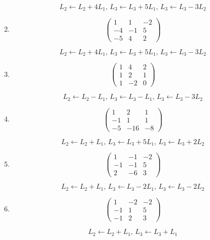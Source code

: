 \documentclass{article}
\begin{document}
\begin{enumerate}

$$ L_2 \leftarrow L_2 + 4L_1,\, 
L_3 \leftarrow L_3 + 5L_1,\, 
L_3 \leftarrow L_3 - 3L_2 $$
\item
$$ \begin{pmatrix}
1 & 1 & -2 \\ 
-4 & -1 & 5 \\ 
-5 & 4 & 2
\end{pmatrix} $$


$$ L_2 \leftarrow L_2 + 4L_1,\, 
L_3 \leftarrow L_3 + 5L_1,\, 
L_3 \leftarrow L_3 - 3L_2 $$
\item
$$ \begin{pmatrix}
1 & 4 & 2 \\ 
1 & 2 & 1 \\ 
1 & -2 & 0
\end{pmatrix} $$


$$ L_2 \leftarrow L_2 - L_1,\, 
L_3 \leftarrow L_3 - L_1,\, 
L_3 \leftarrow L_3 - 3L_2 $$
\item
$$ \begin{pmatrix}
1 & 2 & 1 \\ 
-1 & 1 & 1 \\ 
-5 & -16 & -8
\end{pmatrix} $$


$$ L_2 \leftarrow L_2 + L_1,\, 
L_3 \leftarrow L_3 + 5L_1,\, 
L_3 \leftarrow L_3 + 2L_2 $$
\item
$$ \begin{pmatrix}
1 & -1 & -2 \\ 
-1 & -1 & 5 \\ 
2 & -6 & 3
\end{pmatrix} $$


$$ L_2 \leftarrow L_2 + L_1,\, 
L_3 \leftarrow L_3 - 2L_1,\, 
L_3 \leftarrow L_3 - 2L_2 $$
\item
$$ \begin{pmatrix}
1 & -2 & -2 \\ 
-1 & 1 & 5 \\ 
-1 & 2 & 3
\end{pmatrix} $$


$$ L_2 \leftarrow L_2 + L_1,\, 
L_3 \leftarrow L_3 + L_1 $$

\end{enumerate}
\end{document}
